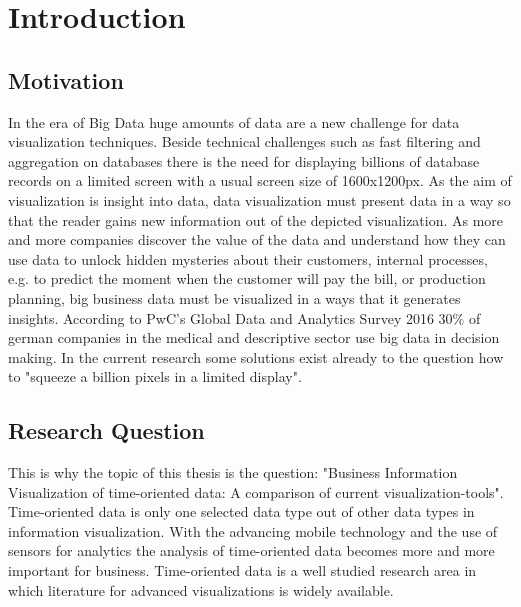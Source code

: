 \chapter{Introduction}
\label{chap:introduction}

\section{Motivation}
In the era of Big Data huge amounts of data are a new challenge for data visualization techniques. Beside technical challenges such as fast filtering and aggregation on databases there is the need for displaying billions of database records on a limited screen with a usual screen size of 1600x1200px. As the aim of visualization is insight into data, data visualization must present data in a way so that the reader gains new information out of the depicted visualization. 
As more and more companies discover the value of the data and understand how they can use data to unlock hidden mysteries about their customers, internal processes, e.g. to predict the moment when the customer will pay the bill, or production planning, big business data must be visualized in a ways that it generates insights. According to PwC's Global Data and Analytics Survey 2016 30\% of german companies in the medical and descriptive sector use big data in decision making. %
In the current research some solutions exist already to the question how to "squeeze a billion pixels in a limited display"\cite{Shneiderman2008}. 


\section{Research Question}
This is why the topic of this thesis is the question: "Business Information Visualization of time-oriented data: A comparison of current visualization-tools".
Time-oriented data is only one selected data type out of other data types in information visualization. With the advancing mobile technology and the use of sensors for analytics the analysis of time-oriented data becomes more and more important for business. Time-oriented data is a well studied research area in which literature for advanced visualizations is widely available. 


